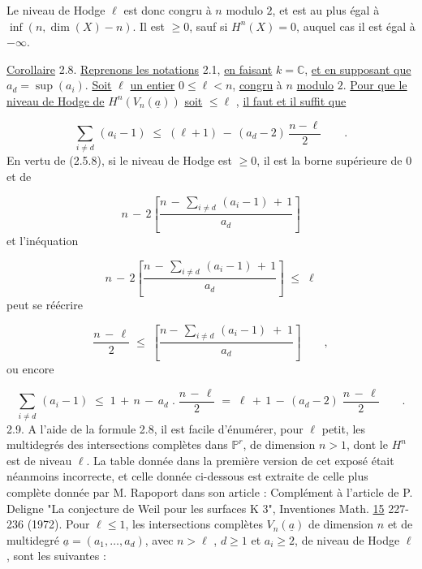 Le niveau de Hodge $\ell$ est donc congru à $n$ modulo $2$, et est au plus égal à $\inf(n,\dim(X) - n)$. Il est $\geq 0$, sauf si $H^n(X) = 0$, auquel cas il est égal à $- \infty$.

\underline{Corollaire} 2.8. \underline{Reprenons les notations} 2.1, \underline{en faisant} $k = \mathbb{C}$, \underline{et en supposant que} $a_d = \sup (a_i)$. \underline{Soit} $\ell$ \underline{un entier} $0 \leq \ell < n$, \underline{congru} à $n$ \underline{modulo} $2$. \underline{Pour que le niveau de Hodge de} $H^n(V_n(\underline{a}))$ \underline{soit} $\leq \ell$ , \underline{il faut et il suffit que} 



\begin{equation*}
 \sum_{i \neq d} \, (a_i - 1) \;\leq\; (\ell + 1) \, - \, (a_d - 2) \, \frac{n - \ell}{2} \qquad .
\end{equation*}
En vertu de (2.5.8), si le niveau de Hodge est $\geq 0$, il est la borne supérieure de 0 et de

\begin{equation*}
n \, - \, 2 \left[ \frac{n \, - \, \sum_{i \neq d} \, (a_i - 1) \, + \, 1}{a_d} \right]
\end{equation*}
et l'inéquation

\begin{equation*}
n \, - \, 2 \left[ \frac{n \, - \, \sum_{i \neq d} \, (a_i - 1) \, + \, 1}{a_d} \right] \;\leq\; \ell
\end{equation*}
peut se réécrire

\begin{equation*}
\frac{n \, - \, \ell}{2} \;\leq\; \left[ \frac{n - \, \sum_{i \neq d} \, (a_i - 1) \; + \; 1}{a_d} \right] \qquad ,
\end{equation*}
ou encore

\begin{equation*}
\sum_{i \neq d} \, (a_i - 1) \;\leq\; 1 \, + \, n \, - \, a_d \; . \; \frac{n \, - \, \ell}{2} \;=\; \ell \, + \, 1 \, - \, (a_d - 2) \; \frac{n \, - \, \ell}{2} \qquad .
\end{equation*}
2.9. \quad A l'aide de la formule 2.8, il est facile d'énumérer, pour $\ell$ petit, les multidegrés des intersections complètes dans $\mathbb{P}^r$, de dimension $n > 1$, dont le $H^n$ est de niveau $\ell$. La table donnée dans la première version de cet exposé était néanmoins incorrecte, et celle donnée ci-dessous est extraite de celle plus complète donnée par M. Rapoport dans son article : Complément à l'article de P. Deligne "La conjecture de Weil pour les surfaces K 3", Inventiones Math. \underline{15} 227-236 (1972). Pour $\ell \leq 1$, les intersections complètes $V_n(\underline{a})$ de dimension $n$ et de multidegré $\underline{a} = (a_1,\ldots,a_d)$, avec $n > \ell$ , $d \geq 1$ et $a_i \geq 2$, de niveau de Hodge $\ell$ , sont les suivantes :


